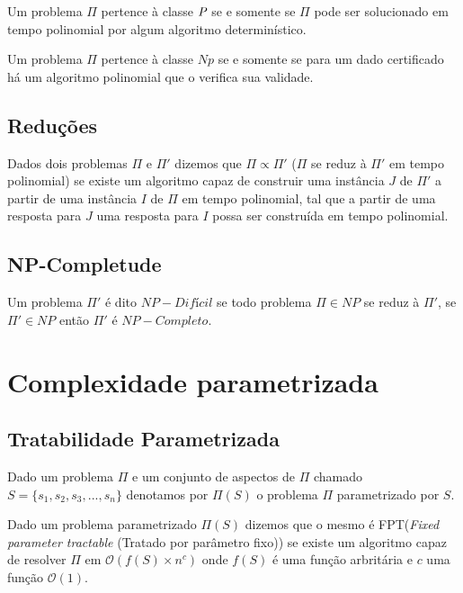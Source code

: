 Um problema $\Pi$ pertence à classe $\P$ se e somente se $\Pi$ pode ser solucionado em tempo polinomial por algum algoritmo determinístico.

Um problema $\Pi$ pertence à classe $\textit{Np}$ se e somente se para um dado certificado há um algoritmo polinomial que o verifica sua validade.

\subsection{Reduções}
Dados dois problemas $\Pi$ e $\Pi'$ dizemos que $\Pi \propto \Pi'$ ($\Pi$ se reduz à $\Pi'$ em tempo polinomial) se existe um algoritmo capaz de construir uma instância $J$ de $\Pi'$ a partir de uma instância $I$ de $\Pi$ em tempo polinomial, tal que a partir de uma resposta para $J$ uma resposta para $I$ possa ser construída em tempo polinomial. 

\subsection{NP-Completude}
Um problema $\Pi'$ é dito $NP-Difícil$ se todo problema $\Pi \in NP$ se reduz à $\Pi'$, se $\Pi' \in NP$ então $\Pi'$ é $NP-Completo$.

\section{Complexidade parametrizada}

\subsection{Tratabilidade Parametrizada}
\begin{definition}
Dado um problema $\Pi$ e um conjunto de aspectos de $\Pi$ chamado $S = \{s_1,s_2,s_3,...,s_n\}$ denotamos por $\Pi(S)$ o problema $\Pi$ parametrizado por $S$.
\end{definition}
\begin{definition}
Dado um problema parametrizado $\Pi(S)$ dizemos que o mesmo é FPT(\emph{Fixed parameter tractable} (Tratado por parâmetro fixo)) se existe um algoritmo capaz de resolver $\Pi$ em $\mathcal{O}(f(S)\times n^c)$ onde $f(S)$ é uma função arbritária e $c$ uma função $\mathcal{O}(1)$.
\end{definition}

